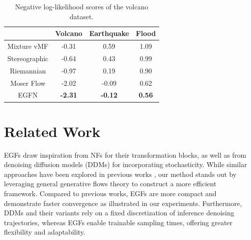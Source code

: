 \documentclass{article}
\theoremstyle{plain}
\theoremstyle{definition}
\theoremstyle{remark}
\theoremstyle{fact}
\begin{document}
\begin{table}
    \caption{Negative log-likelihood scores of the volcano dataset.}
    \centering
    \begin{tabular}{c c c c}
       & Volcano
       & Earthquake & Flood
       \\
     \hline
     Mixture vMF & -0.31  
     & 0.59 & 1.09 
     \\
     Stereographic & -0.64 
     & 0.43 & 0.99
     \\
     Riemannian & -0.97 
     & 0.19 & 0.90
     \\
     Moser Flow & -2.02 & -0.09 & 0.62 
     \\
     EGFN & \textbf{-2.31} & \textbf{-0.12} & \textbf{0.56} 
     \\
     \hline
    \end{tabular}
    \label{table:nll}
\end{table}

\section{Related Work}
\label{Related Work}
EGFs draw inspiration from NFs for their transformation blocks, as well as from denoising diffusion models (DDMs) \cite{ho2020denoising} for incorporating stochasticity. While similar approaches have been explored in previous works \cite{wu2020stochastic, zhang2021diffusion}, our method stands out by leveraging general generative flows theory to construct a more efficient framework. Compared to previous works, EGFs are more compact and demonstrate faster convergence as illustrated in our experiments. Furthermore, DDMs and their variants \cite{song2020denoising} rely on a fixed discretization of inference denoising trajectories, whereas EGFs enable trainable sampling times, offering greater flexibility and adaptability.
\end{document}
